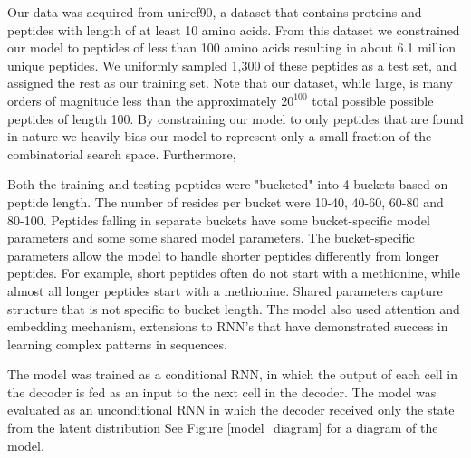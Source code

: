 \documentclass[final,1p,times]{elsarticle}
\begin{document}
Our data was acquired from uniref90, a dataset that contains proteins and peptides with length of at least 10 amino acids. From this dataset we constrained our model to peptides of less than 100 amino acids resulting in about 6.1 million unique peptides. We uniformly sampled 1,300 of these peptides as a test set, and assigned the rest as our training set. Note that our dataset, while large, is many orders of magnitude less than the approximately $20^{100}$ total possible possible peptides of length 100. By constraining our model to only peptides that are found in nature we heavily bias our model to represent only a small fraction of the combinatorial search space. Furthermore, 

Both the training and testing peptides were "bucketed" into 4 buckets based on peptide length. The number of resides per bucket were 10-40, 40-60, 60-80 and 80-100. Peptides falling in separate buckets have some bucket-specific model parameters and some some shared model parameters. The bucket-specific parameters allow the model to handle shorter peptides differently from longer peptides. For example, short peptides often do not start with a methionine, while almost all longer peptides start with a methionine. Shared parameters capture structure that is not specific to bucket length. The model also used attention and embedding mechanism, extensions to RNN's that have demonstrated success in learning complex patterns in sequences\cite{chorowski2014end}. 

The model was trained as a conditional RNN\cite{cho2014learning}, in which the output of each cell in the decoder is fed as an input to the next cell in the decoder. The model was evaluated as an unconditional RNN in which the decoder received only the state from the latent distribution See Figure \ref{model_diagram} for a diagram of the model.

%
%
\end{document}
